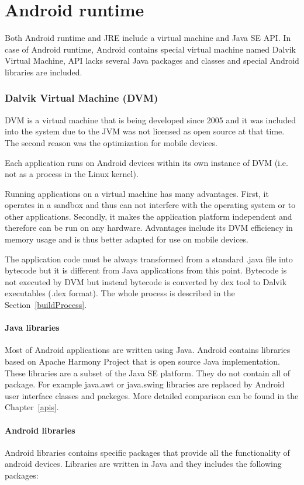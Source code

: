 \section{Android runtime}\label{AndroidRuntime}
Both Android runtime and JRE include a virtual machine and Java SE API. In case of Android runtime, Android contains special virtual machine named Dalvik Virtual Machine, API lacks several Java packages and classes and special Android libraries are included.

\subsubsection{Dalvik Virtual Machine (DVM)}
DVM is a virtual machine that is being developed since 2005 and it was included into the system due to the JVM was not licensed as open source at that time. The second reason was the optimization for mobile devices. 

Each application runs on Android devices within its own instance of DVM (i.e. not as a process in the Linux kernel).

Running applications on a virtual machine has many advantages. First, it operates in a sandbox and thus can not interfere with the operating system or to other applications. Secondly, it makes the application platform independent and therefore can be run on any hardware. Advantages include its DVM efficiency in memory usage and is thus better adapted for use on mobile devices.

The application code must be always transformed from a standard .java file into bytecode but it is different from Java applications from this point. Bytecode is not executed by DVM but instead bytecode is converted by dex tool to Dalvik executables (.dex format). The whole process is described in the Section~\ref{buildProcess}.


\paragraph{Java libraries}
Most of Android applications are written using Java. Android contains libraries based on Apache Harmony Project that is open source Java implementation. These libraries are a subset of the Java SE platform. They do not contain all of package. For example java.awt or java.swing libraries are replaced by Android user interface classes and packeges. More detailed comparison can be found in the Chapter~\ref{apis}.

\paragraph{Android libraries}
Android libraries contains specific packages that provide all the functionality of android devices. Libraries are written in Java and they includes the following packages:

